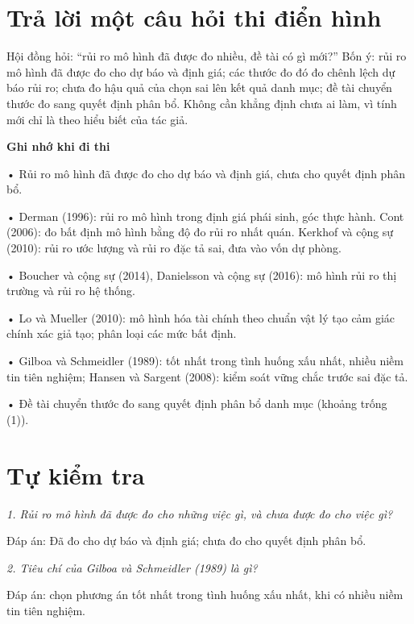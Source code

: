 \section{Trả lời một câu hỏi thi điển hình}

Hội đồng hỏi: “rủi ro mô hình đã được đo nhiều, đề tài có gì mới?” Bốn ý: rủi ro mô hình đã được đo cho dự báo và định giá; các thước đo đó đo chênh lệch dự báo rủi ro; chưa đo hậu quả của chọn sai lên kết quả danh mục; đề tài chuyển thước đo sang quyết định phân bổ. Không cần khẳng định chưa ai làm, vì tính mới chỉ là theo hiểu biết của tác giả.

\begin{tcolorbox}[breakable]
\textbf{Ghi nhớ khi đi thi}

• Rủi ro mô hình đã được đo cho dự báo và định giá, chưa cho quyết định phân bổ.

• Derman (1996): rủi ro mô hình trong định giá phái sinh, góc thực hành. Cont (2006): đo bất định mô hình bằng độ đo rủi ro nhất quán. Kerkhof và cộng sự (2010): rủi ro ước lượng và rủi ro đặc tả sai, đưa vào vốn dự phòng.

• Boucher và cộng sự (2014), Danielsson và cộng sự (2016): mô hình rủi ro thị trường và rủi ro hệ thống.

• Lo và Mueller (2010): mô hình hóa tài chính theo chuẩn vật lý tạo cảm giác chính xác giả tạo; phân loại các mức bất định.

• Gilboa và Schmeidler (1989): tốt nhất trong tình huống xấu nhất, nhiều niềm tin tiên nghiệm; Hansen và Sargent (2008): kiểm soát vững chắc trước sai đặc tả.

• Đề tài chuyển thước đo sang quyết định phân bổ danh mục (khoảng trống (1)).
\end{tcolorbox}

\section{Tự kiểm tra}

{\itshape 1. Rủi ro mô hình đã được đo cho những việc gì, và chưa được đo cho việc gì?\par}

Đáp án: Đã đo cho dự báo và định giá; chưa đo cho quyết định phân bổ.

{\itshape 2. Tiêu chí của Gilboa và Schmeidler (1989) là gì?\par}

Đáp án: chọn phương án tốt nhất trong tình huống xấu nhất, khi có nhiều niềm tin tiên nghiệm.

